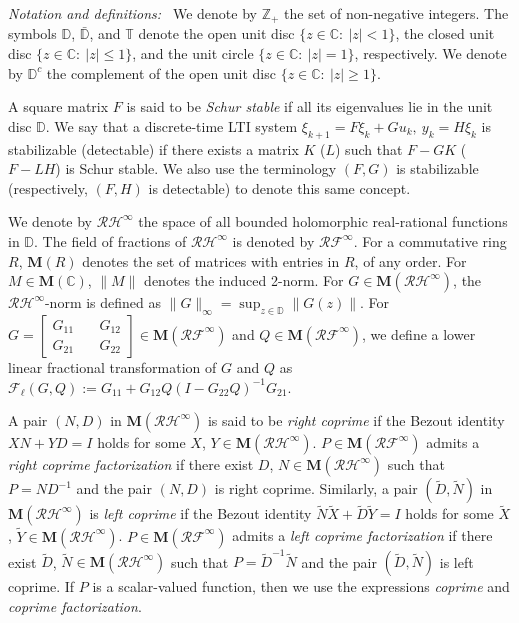 \documentclass[letterpaper, 12pt, draftcls, onecolumn]{ieeeconf}
\begin{document}
{\it Notation and definitions:~}
We denote by $\mathbb{Z}_+$ the set of non-negative integers.
The symbols 
$\mathbb{D}$, $\bar{\mathbb{D}}$, and $\mathbb{T}$ denote
the open unit disc $\{ z \in \mathbb{C}:~ |z| < 1\}$,
the closed unit disc $\{ z \in \mathbb{C}:~ |z| \leq 1\}$, and
the unit circle $\{ z \in \mathbb{C}:~ |z| = 1\}$, respectively.
We denote by $\mathbb{D}^c$ the complement of the open unit disc
$\{ z \in \mathbb{C}:~ |z| \geq  1\}$.


A square matrix $F$ is said to be {\em Schur stable}
if all its eigenvalues lie in the unit disc $\mathbb{D}$.
We say that a discrete-time LTI system $\xi_{k+1} = F\xi_k + Gu_k,~y_k = H \xi_k$
is stabilizable (detectable) if 
there exists a matrix $K$ ($L$) such that $F-GK$ ($F-LH$) is Schur stable.
We also use the terminology $(F, G)$ is 
stabilizable (respectively, $(F, H)$ is detectable) to denote
this same concept.

We denote by $\mathcal{RH}^{\infty}$ the space of all bounded holomorphic
real-rational
functions in $\mathbb{D}$.
The field of fractions of 
$\mathcal{RH}^{\infty}$ is denoted by $\mathcal{RF}^{\infty}$.
For a commutative ring $R$, 
$\mathbf{M}(R)$ denotes the set of
matrices with entries in $R$, of any order.
For $M \in \mathbf{M}(\mathbb{C})$,
$\|M\|$ denotes the induced 2-norm.
For $G \in \mathbf{M}(\mathcal{RH}^{\infty})$,
the $\mathcal{RH}^{\infty}$-norm is defined as $\|G\|_{\infty} = 
\sup_{z\in\mathbb{D}} \|G(z)\|$.
For $G = \begin{bmatrix}
G_{11} &\quad  G_{12} \\
G_{21} &\quad  G_{22}
\end{bmatrix} \in \mathbf{M}(\mathcal{RF}^{\infty})$ and
$Q\in \mathbf{M}(\mathcal{RF}^{\infty})$,
we define a lower linear fractional transformation of $G$ and $Q$
as
$\mathcal{F}_{\ell}(G, Q) := G_{11} + G_{12}Q(I-G_{22}Q)^{-1}G_{21}$.


A pair $(N, D)$ in $\mathbf{M}(\mathcal{RH}^{\infty})$ is said to be 
{\em right coprime} if  the Bezout identity 
$	X N + Y D=I $
holds for some $X$, $Y \in \mathbf{M}(\mathcal{RH}^{\infty})$.
$P \in \mathbf{M}(\mathcal{RF}^{\infty})$ admits a {\em right coprime
	factorization} if there exist $D$, $N \in \mathbf{M}(\mathcal{RH}^{\infty})$ 
such that 
$P = ND^{-1}$ and the pair $(N,D)$ is right coprime.
Similarly, a pair $(\tilde D,\tilde N)$ 
in $\mathbf{M}(\mathcal{RH}^{\infty})$ 
is {\em left coprime} if the Bezout identity 
$	\tilde N \tilde X + \tilde D \tilde Y=I$
holds for some $\tilde X$, $\tilde Y \in \mathbf{M}(\mathcal{RH}^{\infty})$.
$P \in \mathbf{M}(\mathcal{RF}^{\infty})$ admits a {\em left coprime
	factorization} if there exist $\tilde D$, $\tilde N \in
\mathbf{M}(\mathcal{RH}^{\infty})$ 
such that $P = \tilde D^{-1} \tilde N$ and the pair 
$(\tilde D,\tilde N)$ is left coprime.
If $P$ is a scalar-valued function, then we use the expressions {\em coprime} and
{\em coprime factorization}. 
\end{document}
